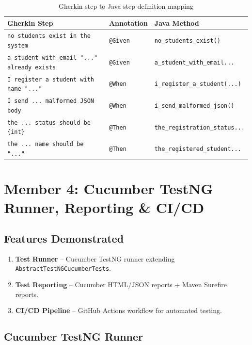\documentclass[12pt,a4paper]{article}
\begin{document}
\begin{table}[h!]
\centering
\small
\begin{tabular}{lll}
    \toprule
    \textbf{Gherkin Step} & \textbf{Annotation} & \textbf{Java Method} \\
    \midrule
    \texttt{no students exist in the system} & \texttt{@Given} & \texttt{no\_students\_exist()} \\
    \texttt{a student with email "..." already exists} & \texttt{@Given} & \texttt{a\_student\_with\_email...} \\
    \texttt{I register a student with name "..."} & \texttt{@When} & \texttt{i\_register\_a\_student(...)} \\
    \texttt{I send ... malformed JSON body} & \texttt{@When} & \texttt{i\_send\_malformed\_json()} \\
    \texttt{the ... status should be \{int\}} & \texttt{@Then} & \texttt{the\_registration\_status...} \\
    \texttt{the ... name should be "..."} & \texttt{@Then} & \texttt{the\_registered\_student...} \\
    \bottomrule
\end{tabular}
\caption{Gherkin step to Java step definition mapping}
\end{table}

\section{Member 4: Cucumber TestNG Runner, Reporting \& CI/CD}
\label{sec:member4}

\subsection{Features Demonstrated}
\begin{enumerate}
    \item \textbf{Test Runner} -- Cucumber TestNG runner extending \texttt{AbstractTestNGCucumberTests}.
    \item \textbf{Test Reporting} -- Cucumber HTML/JSON reports + Maven Surefire reports.
    \item \textbf{CI/CD Pipeline} -- GitHub Actions workflow for automated testing.
\end{enumerate}

\subsection{Cucumber TestNG Runner}
\end{document}
